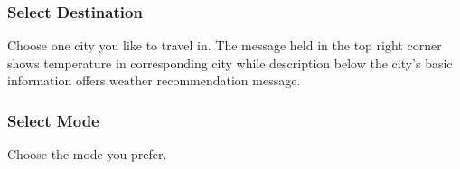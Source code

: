 \documentclass[10pt]{article}
\begin{document}
\subsubsection{Select Destination}
Choose one city you like to travel in. The message held in the top right corner shows temperature in corresponding city while description below the city’s basic information offers weather recommendation message.

\subsubsection{Select Mode}
Choose the mode you prefer.

\begin{figure}[H]
	\centering
	\quad

\end{figure}
\end{document}

